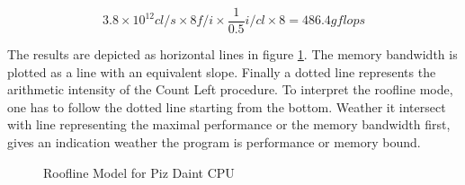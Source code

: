 \documentclass[]{article}
\begin{document}
\begin{center}
	\begin{equation}
	3.8 \times 10^{12} cl/s \times 8 f/i \times \frac{1}{0.5} i/cl \times 8 = 486.4 gflops
	\end{equation}
	\label{eq:daintp3}
\end{center}

The results are depicted as horizontal lines in figure \ref{fig:roofdaint}. The memory bandwidth is plotted as a line with an equivalent slope. Finally a dotted line represents the arithmetic intensity of the Count Left procedure. 
To interpret the roofline mode, one has to follow the dotted line starting from the bottom. Weather it intersect with line representing the maximal performance or the memory bandwidth first, gives an indication weather the program is performance or memory bound. 

\begin{figure}[H]
	\begin{center}
	\caption{Roofline Model for Piz Daint CPU}
	\label{fig:roofdaint}
	\end{center}
\end{figure}
\end{document}
